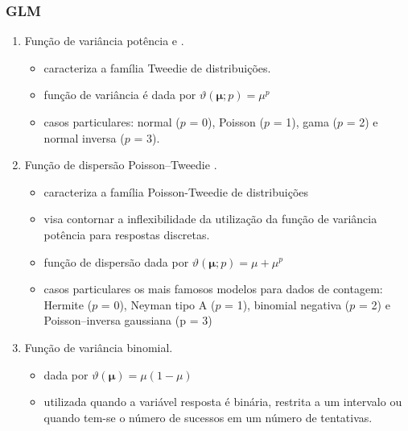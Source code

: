 \documentclass[10pt,
  aspectratio=169,
  serif,
  mathserif,
  professionalfont,
  compress,
  handout,
  ]{beamer}\usepackage[]{graphicx}\usepackage[]{color}
\begin{document}
\begin{frame}

  \frametitle{GLM}
  
  \begin{enumerate}
  \item Função de variância potência \cite{Jorgensen87} e \cite{Jorgensen97}. 
  
    \begin{itemize}
      \item caracteriza a família Tweedie de distribuições.
      \item função de variância é dada por $\vartheta\left(\boldsymbol{\mu}; p\right) = \mu^p$
      \item casos particulares: normal ($p$ = 0), Poisson ($p$ = 1), gama ($p$ = 2) e normal inversa ($p$ = 3).
    \end{itemize}

  
  \item Função de dispersão Poisson–Tweedie \cite{Jorgensen15}.
  
    \begin{itemize}
      \item caracteriza a família Poisson-Tweedie de distribuições
      \item visa contornar a inflexibilidade da utilização da função de variância potência para respostas discretas. 
      \item função de dispersão dada por $\vartheta\left(\boldsymbol{\mu}; p\right) = \mu + \mu^p$
      \item casos particulares os mais famosos modelos para dados de contagem: Hermite ($p$ = 0), Neyman tipo A ($p$ = 1), binomial negativa ($p$ = 2) e Poisson–inversa gaussiana (p = $3$)
      
    \end{itemize}

  \item Função de variância binomial. 
  
    \begin{itemize}
      \item dada por $\vartheta(\boldsymbol{\mu}) = \mu(1 - \mu)$
      \item utilizada quando a variável resposta é binária, restrita a um intervalo ou quando tem-se o número de sucessos em um número de tentativas.
    \end{itemize}

\end{enumerate}

\end{frame}
\end{document}
